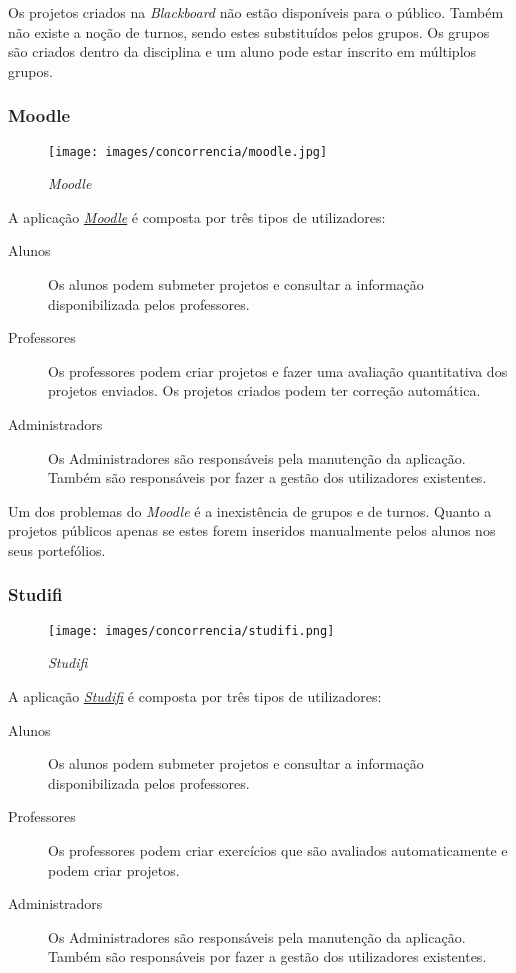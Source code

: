 Os projetos criados na \emph{Blackboard} não estão disponíveis para o público. Também não existe a noção de turnos, sendo estes substituídos pelos grupos. Os grupos são criados dentro da disciplina e um aluno pode estar inscrito em múltiplos grupos.

\subsubsection{Moodle} %
\label{ssub:moodle}
\begin{figure}[H]
        \centering
        \texttt{[image: images/concorrencia/moodle.jpg]}
         \caption{\emph{Moodle}}
         \label{fig: moodle}
\end{figure}
A aplicação \href{http://www.moodle.org}{\emph{Moodle}} é composta por três tipos de utilizadores:

\begin{description}
	\item[Alunos] Os alunos podem submeter projetos e consultar a informação disponibilizada pelos professores.
	\item[Professores] Os professores podem criar projetos e fazer uma avaliação quantitativa dos projetos enviados. Os projetos criados podem ter correção automática.
	\item[Administradors] Os Administradores são responsáveis pela manutenção da aplicação. Também são responsáveis por fazer a gestão dos utilizadores existentes.
\end{description}


Um dos problemas do \emph{Moodle} é a inexistência de grupos e de turnos. Quanto a projetos públicos apenas se estes forem inseridos manualmente pelos alunos nos seus portefólios.

\subsubsection{Studifi} %
\label{ssub:studifi}

\begin{figure}[H]
        \centering
        \texttt{[image: images/concorrencia/studifi.png]}
         \caption{\emph{Studifi}}
         \label{fig: studifi}
\end{figure}

A aplicação \href{https://studifi.com/}{\emph{Studifi}} é composta por três tipos de utilizadores:

\begin{description}
	\item[Alunos] Os alunos podem submeter projetos e consultar a informação disponibilizada pelos professores.
	\item[Professores] Os professores podem criar exercícios que são avaliados automaticamente e podem criar projetos.
	\item[Administradors] Os Administradores são responsáveis pela manutenção da aplicação. Também são responsáveis por fazer a gestão dos utilizadores existentes.
\end{description}

